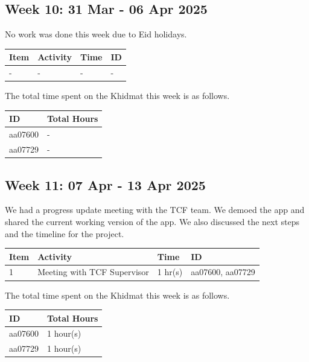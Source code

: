 \documentclass[12pt,a4paper]{article}
\begin{document}
\newpage

\subsection{Week 10: 31 Mar - 06 Apr 2025}
No work was done this week due to Eid holidays.

\begin{center}
    \bigskip
    \begin{tabular}{|l|l|l|l|}
        \hline
        Item 	& Activity & Time & ID \\\hline\hline
        - & - & - & - \\\hline
    \end{tabular}

    \bigskip
    The total time spent on the Khidmat this week is as follows.

    \bigskip
    \begin{tabular}{|l|l|}
        \hline
        ID & Total Hours\\\hline\hline
        aa07600 & -\\\hline
        aa07729 & -\\\hline
    \end{tabular}
\end{center}

\newpage

\subsection{Week 11: 07 Apr - 13 Apr 2025}
We had a progress update meeting with the TCF team. We demoed the app and shared the current working version of the app. We also discussed the next steps and the timeline for the project.

\begin{center}
    \bigskip
    \begin{tabular}{|l|l|l|l|}
        \hline
        Item 	& Activity & Time & ID \\\hline\hline
        1	& Meeting with TCF Supervisor  & 1 hr(s) & aa07600, aa07729 \\\hline
    \end{tabular}

    \bigskip
    The total time spent on the Khidmat this week is as follows.

    \bigskip
    \begin{tabular}{|l|l|}
        \hline
        ID & Total Hours\\\hline\hline
        aa07600 & 1 hour(s)\\\hline
        aa07729 & 1 hour(s)\\\hline
    \end{tabular}
\end{center}
\end{document}

